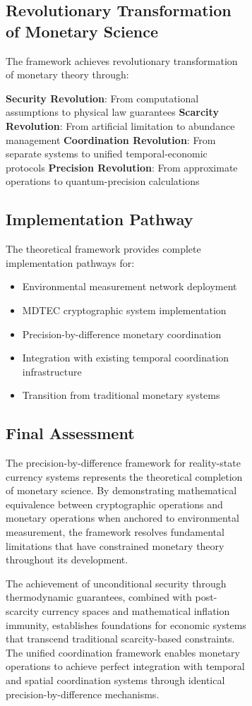 \documentclass[12pt,a4paper]{article}
\begin{document}
\begin{figure}[H]
\begin{figure}[H]
\subsection{Revolutionary Transformation of Monetary Science}

The framework achieves revolutionary transformation of monetary theory through:

\textbf{Security Revolution}: From computational assumptions to physical law guarantees
\textbf{Scarcity Revolution}: From artificial limitation to abundance management  
\textbf{Coordination Revolution}: From separate systems to unified temporal-economic protocols
\textbf{Precision Revolution}: From approximate operations to quantum-precision calculations

\subsection{Implementation Pathway}

The theoretical framework provides complete implementation pathways for:
\begin{itemize}
\item Environmental measurement network deployment
\item MDTEC cryptographic system implementation
\item Precision-by-difference monetary coordination
\item Integration with existing temporal coordination infrastructure
\item Transition from traditional monetary systems
\end{itemize}

\subsection{Final Assessment}

The precision-by-difference framework for reality-state currency systems represents the theoretical completion of monetary science. By demonstrating mathematical equivalence between cryptographic operations and monetary operations when anchored to environmental measurement, the framework resolves fundamental limitations that have constrained monetary theory throughout its development.

The achievement of unconditional security through thermodynamic guarantees, combined with post-scarcity currency spaces and mathematical inflation immunity, establishes foundations for economic systems that transcend traditional scarcity-based constraints. The unified coordination framework enables monetary operations to achieve perfect integration with temporal and spatial coordination systems through identical precision-by-difference mechanisms.


\end{figure}
\end{figure}
\end{document}
